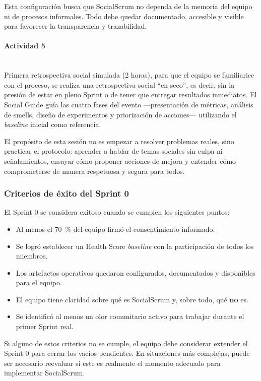 Esta configuración busca que SocialScrum no dependa de la memoria del equipo ni de procesos informales. Todo debe quedar documentado, accesible y visible para favorecer la transparencia y trazabilidad.

\paragraph{Actividad 5}
\mbox{}\\[-0.1\baselineskip]
Primera retrospectiva social simulada (2 horas), para que el equipo se familiarice con el proceso, se realiza una retrospectiva social “en seco”, es decir, sin la presión de estar en pleno Sprint o de tener que entregar resultados inmediatos. El Social Guide guía las cuatro fases del evento —presentación de métricas, análisis de smells, diseño de experimentos y priorización de acciones— utilizando el \textit{baseline} inicial como referencia.

El propósito de esta sesión no es empezar a resolver problemas reales, sino practicar el protocolo: aprender a hablar de temas sociales sin culpa ni señalamientos, ensayar cómo proponer acciones de mejora y entender cómo comprometerse de manera respetuosa y segura para todos.

\subsubsection{Criterios de éxito del Sprint 0}

El Sprint 0 se considera exitoso cuando se cumplen los siguientes puntos:

\begin{itemize}
    \item Al menos el 70~\% del equipo firmó el consentimiento informado.
    \item Se logró establecer un Health Score \textit{baseline} con la participación de todos los miembros.
    \item Los artefactos operativos quedaron configurados, documentados y disponibles para el equipo.
    \item El equipo tiene claridad sobre qué es SocialScrum y, sobre todo, qué \textbf{no} es.
    \item Se identificó al menos un olor comunitario activo para trabajar durante el primer Sprint real.
\end{itemize}

Si alguno de estos criterios no se cumple, el equipo debe considerar extender el Sprint 0 para cerrar los vacíos pendientes. En situaciones más complejas, puede ser necesario reevaluar si este es realmente el momento adecuado para implementar SocialScrum.

